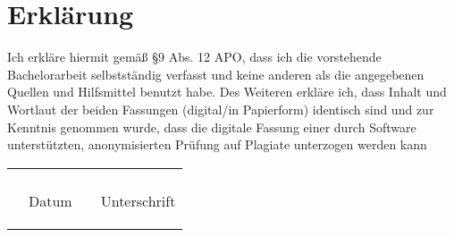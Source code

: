 \chapter*{Erklärung}

Ich erkläre hiermit gemäß §9 Abs. 12 APO, dass ich die vorstehende Bachelorarbeit selbstständig verfasst und keine anderen als die angegebenen Quellen und Hilfsmittel benutzt habe. Des Weiteren erkläre ich, dass Inhalt und Wortlaut der beiden Fassungen (digital/in Papierform) identisch sind und zur Kenntnis genommen wurde, dass die digitale Fassung einer durch Software unterstützten, anonymisierten Prüfung auf Plagiate unterzogen werden kann

\vspace{2cm}
\begin{tabular}{@{}p{0cm}p{6cm}p{}p{6cm}@{}}
& \hrulefill& & \hrulefill\\
& \begin{flushleft}Datum\end{flushleft} & & \begin{flushleft}Unterschrift\end{flushleft}\\
\end{tabular}
